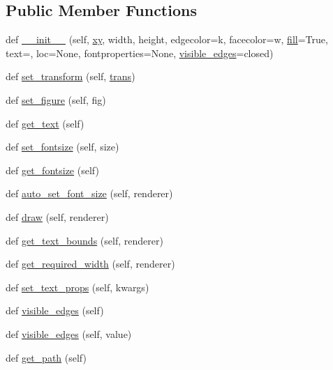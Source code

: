 \subsection*{Public Member Functions}
\begin{DoxyCompactItemize}
\item 
def \hyperlink{classmatplotlib_1_1table_1_1Cell_afdc76038b216134e1153f38f680fa94e}{\+\_\+\+\_\+init\+\_\+\+\_\+} (self, \hyperlink{classmatplotlib_1_1patches_1_1Rectangle_a7febcd40cac82459d66c33ddfc6ba09f}{xy}, width, height, edgecolor=\textquotesingle{}k\textquotesingle{}, facecolor=\textquotesingle{}w\textquotesingle{}, \hyperlink{classmatplotlib_1_1patches_1_1Patch_a59e3f9086d41642557cf2f8fb1d57a6d}{fill}=True, text=\textquotesingle{}\textquotesingle{}, loc=None, fontproperties=None, \hyperlink{classmatplotlib_1_1table_1_1Cell_a9638e7bf569e84977d7b73bc72b453dd}{visible\+\_\+edges}=\textquotesingle{}closed\textquotesingle{})
\item 
def \hyperlink{classmatplotlib_1_1table_1_1Cell_aff269ae393e8fdc54357943ec13fda1d}{set\+\_\+transform} (self, \hyperlink{size_2foo_8f90_afabfd8da71309850231a00e53c61f106}{trans})
\item 
def \hyperlink{classmatplotlib_1_1table_1_1Cell_a0cde0de002653648c6ba8f6b6ff39dd3}{set\+\_\+figure} (self, fig)
\item 
def \hyperlink{classmatplotlib_1_1table_1_1Cell_a0a769932dbf9e6bebc21d40a63bb30db}{get\+\_\+text} (self)
\item 
def \hyperlink{classmatplotlib_1_1table_1_1Cell_a8aa3618d8df8319d4429c2fe3635af26}{set\+\_\+fontsize} (self, size)
\item 
def \hyperlink{classmatplotlib_1_1table_1_1Cell_a1b35fc9accca816bc39f13c8afcab5a9}{get\+\_\+fontsize} (self)
\item 
def \hyperlink{classmatplotlib_1_1table_1_1Cell_a96d590c2b639ddf0deee31e209df4e13}{auto\+\_\+set\+\_\+font\+\_\+size} (self, renderer)
\item 
def \hyperlink{classmatplotlib_1_1table_1_1Cell_a34e488f53ea685d01dc75e676413d5fa}{draw} (self, renderer)
\item 
def \hyperlink{classmatplotlib_1_1table_1_1Cell_aa5c9256a902f5b38f89ad02cbbacee02}{get\+\_\+text\+\_\+bounds} (self, renderer)
\item 
def \hyperlink{classmatplotlib_1_1table_1_1Cell_a6fa5b2fd7bb8216c31f3087fcb7ff856}{get\+\_\+required\+\_\+width} (self, renderer)
\item 
def \hyperlink{classmatplotlib_1_1table_1_1Cell_acc6fd338f2850837c6091d5827ee3c94}{set\+\_\+text\+\_\+props} (self, kwargs)
\item 
def \hyperlink{classmatplotlib_1_1table_1_1Cell_a7569d185908e0a803db40089c2c7a99c}{visible\+\_\+edges} (self)
\item 
def \hyperlink{classmatplotlib_1_1table_1_1Cell_a90354bcde979cddcc4da72a71f68b626}{visible\+\_\+edges} (self, value)
\item 
def \hyperlink{classmatplotlib_1_1table_1_1Cell_a3d9f743009484c9556727f5ba72bb4c4}{get\+\_\+path} (self)
\end{DoxyCompactItemize}
